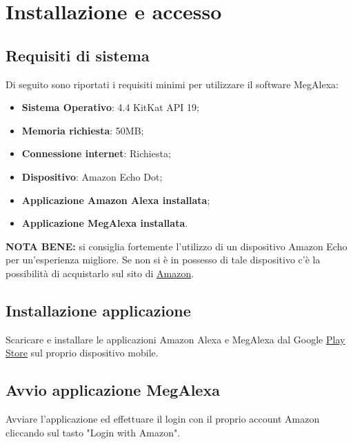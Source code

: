 \chapter{Installazione e accesso}


\section{Requisiti di sistema}
\label{Requisiti sistema}
Di seguito sono riportati i requisiti minimi per utilizzare il software MegAlexa:

\begin{itemize}
	\item \textbf{Sistema Operativo}:  4.4 KitKat API 19;
	\item \textbf{Memoria richiesta}: 50MB;
	\item \textbf{Connessione internet}: Richiesta;
	\item \textbf{Dispositivo}: Amazon Echo Dot;
	\item \textbf{Applicazione Amazon Alexa installata};
	\item \textbf{Applicazione MegAlexa installata}.
\end{itemize}

\textbf{NOTA BENE:} si consiglia fortemente l'utilizzo di un dispositivo Amazon Echo per un'esperienza migliore. Se non si è in possesso di tale dispositivo c'è la possibilità di acquistarlo sul sito di \href{https://www.amazon.it}{Amazon}.

\section{Installazione applicazione}
Scaricare e installare le applicazioni Amazon Alexa e MegAlexa dal Google \href{https://play.google.com/store/apps?hl=it}{Play Store} sul proprio dispositivo mobile.
\newpage
\section{Avvio applicazione MegAlexa}
\label{Installazione MegAlexa}
Avviare l'applicazione ed effettuare il login con il proprio account Amazon cliccando sul tasto "Login with Amazon".

